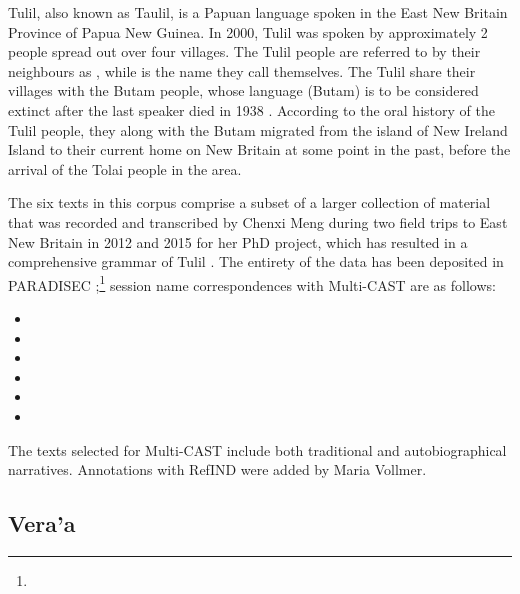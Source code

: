 Tulil, also known as Taulil, is a Papuan language spoken in the East New Britain Province of Papua New Guinea. In 2000, Tulil was spoken by approximately 2 people spread out over four villages. The Tulil people are referred to by their neighbours as , while  is the name they call themselves. The Tulil share their villages with the Butam people, whose language (Butam) is to be considered extinct after the last speaker died in 1938 . According to the oral history of the Tulil people, they along with the Butam migrated from the island of New Ireland Island to their current home on New Britain at some point in the past, before the arrival of the Tolai people in the area.

The six texts in this corpus comprise a subset of a larger collection of material that was recorded and transcribed by Chenxi Meng during two field trips to East New Britain in 2012 and 2015 for her PhD project, which has resulted in a comprehensive grammar of Tulil . The entirety of the data has been deposited in PARADISEC ;\footnote{} session name correspondences with Multi-CAST are as follows:
%
\begin{itemize}
	\TabPositions{5em}
	\item	{}	\tab	{}
	\item	{}	\tab	{}
	\item	{}	\tab	{}
	\item	{}	\tab	{}
	\item	{}	\tab	{}
	\item	{}	\tab	{}
\end{itemize}
%
The texts selected for Multi-CAST include both traditional and autobiographical narratives. Annotations with RefIND were added by Maria Vollmer.




\subsection{Vera'a}
\label{ssec:corpus-veraa}


